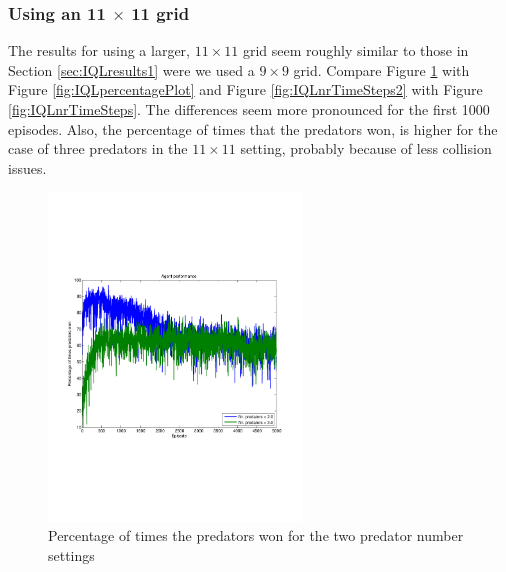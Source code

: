 \FloatBarrier
\clearpage
\subsubsection{Using an 11 $\times$ 11 grid}

The results for using a larger, $11 \times 11$ grid seem roughly similar to those in Section \ref{sec:IQLresults1} were we used a $9 \times 9$ grid. Compare Figure \ref{fig:IQLpercentagePlot2} with Figure \ref{fig:IQLpercentagePlot} and Figure \ref{fig:IQLnrTimeSteps2} with Figure \ref{fig:IQLnrTimeSteps}. The differences seem more pronounced for the first 1000 episodes. Also, the percentage of times that the predators won, is  higher for the case of three predators in the $11 \times 11$ setting, probably because of less collision issues.

\begin{figure}[hbt]
\centering
\includegraphics[bb = 0.6in 3in 7.9in 8.3in,clip,width=0.6\textwidth]
{IQLpercentageWinning5000episodesavg200trials.pdf} 
\caption{Percentage of times the predators won for the two predator number settings}
\label{fig:IQLpercentagePlot2}
\end{figure}
